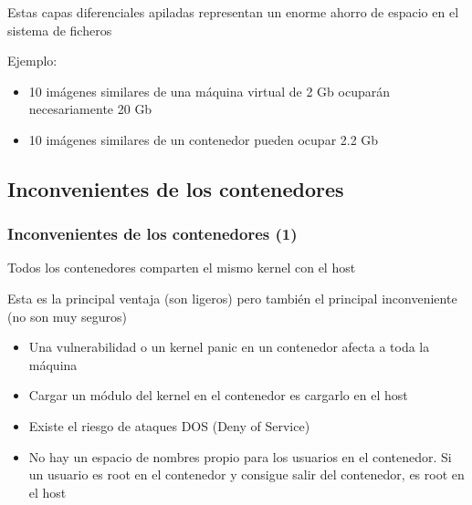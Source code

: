 \documentclass[ucs]{beamer}
\begin{document}
\begin{frame}[fragile]
\frametitle{}
Estas capas diferenciales apiladas representan un enorme ahorro de espacio en 
el sistema de ficheros

Ejemplo:
\begin{itemize}
\item
10 imágenes similares de una máquina virtual de 2 Gb ocuparán necesariamente 20 Gb
\item
10 imágenes similares de un contenedor pueden ocupar  2.2 Gb

\end{itemize}

\end{frame}




\subsection{Inconvenientes de los contenedores}
\begin{frame}[fragile]
\frametitle{Inconvenientes de los contenedores (1)}

Todos los contenedores comparten el mismo kernel con el host

Esta es la principal ventaja (son ligeros) pero también el principal
inconveniente (no son muy seguros)


\begin{itemize}
\item
Una vulnerabilidad o un kernel panic en un contenedor afecta a toda la máquina

\item
Cargar un módulo del kernel en el contenedor es cargarlo en el host

\item
Existe el riesgo de ataques DOS (Deny of Service)

\item
No hay un espacio de nombres propio para los usuarios en el contenedor.
Si un usuario es root en el contenedor y consigue salir del contenedor,
es root en el host

\end{itemize}
\end{frame}
\end{document}
